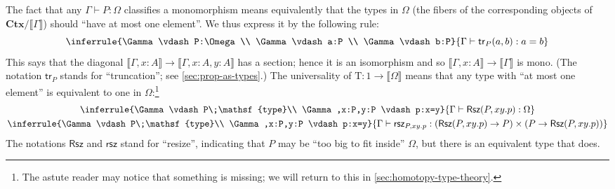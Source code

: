 \documentclass[12pt]{article}
\def\ty{\;\mathsf{type}}
\def\m#1{\llbracket#1\rrbracket}
\def\types{\vdash}
\def\true{\mathrm{T}}
\def\Ctx{\mathbf{Ctx}}
\numberwithin{equation}{section}
\begin{document}
The fact that any $\Gamma \types P:\Omega$ classifies a monomorphism means equivalently that the types in $\Omega$ (the fibers of the corresponding objects of $\Ctx/\m\Gamma$) should ``have at most one element''.
We thus express it by the following rule:
\begin{equation}
  \label{eq:omega-hprop}
  \inferrule{\Gamma\types P:\Omega \\ \Gamma \types a:P \\ \Gamma \types b:P}{\Gamma\types \mathsf{tr}_P(a,b) : a=b}
\end{equation}
This says that the diagonal $\m{\Gamma,x:A} \to \m{\Gamma,x:A,y:A}$ has a section; hence it is an isomorphism and so $\m{\Gamma,x:A} \to \m{\Gamma}$ is mono.
(The notation $\mathsf{tr}_P$ stands for ``truncation''; see \cref{sec:prop-as-types}.)
The universality of $\true:1\to \m\Omega$ means that any type with ``at most one element'' is equivalent to one in $\Omega$:\footnote{The astute reader may notice that something is missing; we will return to this in \cref{sec:homotopy-type-theory}.}
\begin{gather}
  \label{eq:omega-classif}
  \inferrule{\Gamma\types P\ty \\ \Gamma,x:P,y:P \types p:x=y}
  {\Gamma \types \mathsf{Rsz}(P,xy.p):\Omega } %
  \\
  \inferrule{\Gamma\types P\ty \\ \Gamma,x:P,y:P \types p:x=y}{\Gamma\types \mathsf{rsz}_{P,xy.p} :
    (\mathsf{Rsz}(P,xy.p) \to P)\times (P\to \mathsf{Rsz}(P,xy.p))}
\end{gather}
The notations $\mathsf{Rsz}$ and $\mathsf{rsz}$ stand for ``resize'', indicating that $P$ may be ``too big to fit inside'' $\Omega$, but there is an equivalent type that does.
\end{document}
